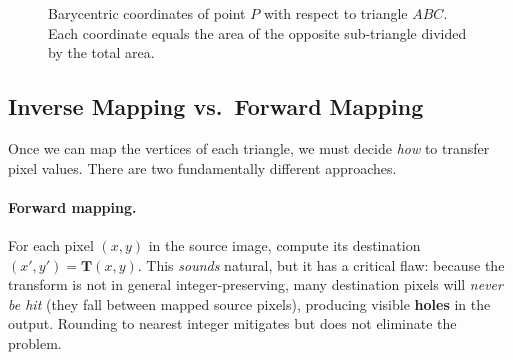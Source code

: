\begin{figure}[htbp]
\centering
{}
\caption{Barycentric coordinates of point $P$ with respect to triangle $ABC$.  Each coordinate equals the area of the opposite sub-triangle divided by the total area.}
\label{fig:barycentric}
\end{figure}

\subsection{Inverse Mapping vs.~Forward Mapping}

Once we can map the vertices of each triangle, we must decide \emph{how} to transfer pixel values.  There are two fundamentally different approaches.

\paragraph{Forward mapping.}
For each pixel $(x, y)$ in the source image, compute its destination $(x', y') = \mathbf{T}(x, y)$.  This \emph{sounds} natural, but it has a critical flaw: because the transform is not in general integer-preserving, many destination pixels will \emph{never be hit} (they fall between mapped source pixels), producing visible \textbf{holes} in the output.  Rounding to nearest integer mitigates but does not eliminate the problem.

